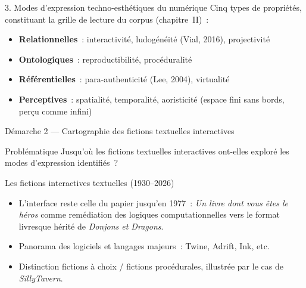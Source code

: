 \documentclass[xcolor=monochrome,11pt]{beamer}
\begin{document}
\begin{frame}{3. Modes d'expression techno-esthétiques du numérique}
  \footnotesize
  Cinq types de propriétés, constituant la grille de lecture du corpus
  (chapitre~II)~:
  \begin{itemize}
    \item \textbf{Relationnelles}~: interactivité, ludogénéité
      (Vial, 2016), projectivité
    \item \textbf{Ontologiques}~: reproductibilité, procéduralité
    \item \textbf{Référentielles}~: para-authenticité (Lee, 2004),
      virtualité
    \item \textbf{Perceptives}~: spatialité, temporalité, aoristicité
      (espace fini sans bords, perçu comme infini)
  \end{itemize}
\end{frame}

\begin{frame}{Démarche 2 --- Cartographie des fictions textuelles interactives}
  \begin{block}{Problématique}
    \small Jusqu'où les fictions textuelles interactives ont-elles
    exploré les modes d'expression identifiés~?
  \end{block}
\end{frame}

\begin{frame}{Les fictions interactives textuelles (1930--2026)}
  \footnotesize
  \begin{itemize}
    \item L'interface reste celle du papier jusqu'en 1977~:
      \emph{Un livre dont vous êtes le héros} comme remédiation des
      logiques computationnelles vers le format livresque hérité de
      \emph{Donjons et Dragons}.
    \item Panorama des logiciels et langages majeurs~: Twine, Adrift,
      Ink, etc.
    \item Distinction fictions à choix / fictions procédurales, illustrée
      par le cas de \emph{SillyTavern}.
  \end{itemize}
\end{frame}
\end{document}
